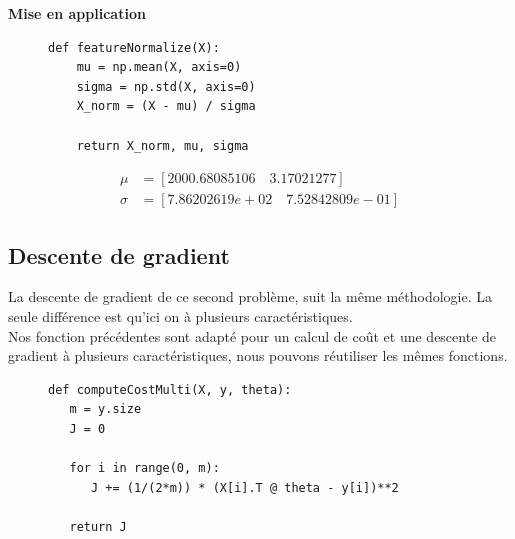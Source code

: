 \clearpage

\vspace{.5cm}
\noindent
\textbf{Mise en application}
\vspace{.2cm}


\begin{figure}[!h]
    \begin{minipage}{.48\linewidth}
\begin{verbatim}
def featureNormalize(X):
    mu = np.mean(X, axis=0)
    sigma = np.std(X, axis=0)
    X_norm = (X - mu) / sigma

    return X_norm, mu, sigma
\end{verbatim}   
    \end{minipage}\hfill
    \begin{minipage}{.48\linewidth}
        \begin{equation*}
            \begin{aligned}
                \mu &= [2000.68085106 \quad 3.17021277] \\
                \sigma &= [7.86202619e+02 \quad 7.52842809e-01]
            \end{aligned}
        \end{equation*}  
    \end{minipage}
\end{figure}


\subsection{Descente de gradient}

La descente de gradient de ce second problème, suit la même méthodologie. La seule différence est qu'ici on à plusieurs caractéristiques. \\
Nos fonction précédentes sont adapté pour un calcul de coût et une descente de gradient à plusieurs caractéristiques, nous pouvons réutiliser les mêmes fonctions.

\begin{figure}[!h]
\begin{verbatim}
def computeCostMulti(X, y, theta):  
   m = y.size
   J = 0

   for i in range(0, m):
      J += (1/(2*m)) * (X[i].T @ theta - y[i])**2
   
   return J
\end{verbatim}   
\label{listing:computeCostMulti}
\end{figure}


